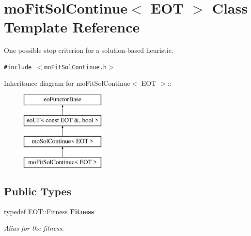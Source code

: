 \section{moFitSolContinue$<$ EOT $>$ Class Template Reference}
\label{classmo_fit_sol_continue}
One possible stop criterion for a solution-based heuristic.  


{\tt \#include $<$moFitSolContinue.h$>$}

Inheritance diagram for moFitSolContinue$<$ EOT $>$::\begin{figure}[H]
\begin{center}
\leavevmode
\includegraphics[height=4cm]{classmo_fit_sol_continue}
\end{center}
\end{figure}
\subsection*{Public Types}
\begin{CompactItemize}
\item 
typedef EOT::Fitness {\bf Fitness}\label{classmo_fit_sol_continue_369ed94a788d8bdc08d5554f7669376f}

\begin{CompactList}\small\item\em Alias for the fitness. \item\end{CompactList}\end{CompactItemize}
